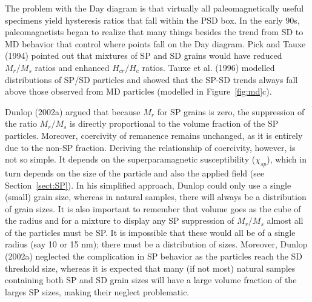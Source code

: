 The problem with the Day diagram is that virtually all paleomagnetically useful specimens yield hysteresis ratios that fall within the PSD box.  In the early 90s, paleomagnetists began to realize that many  things besides the trend from SD to MD behavior that  control where points fall on the Day diagram.   
Pick and Tauxe (1994) \nocite{pick94} pointed out that mixtures of SP and SD grains would have reduced $M_r/M_s$ ratios and enhanced $H_{cr}/H_c$ ratios. 
 Tauxe et al. (1996) \nocite{tauxe96} modelled distributions of SP/SD particles and showed that the SP-SD trends always fall above those observed from MD particles (modelled in Figure~\ref{fig:md}c).  

Dunlop (2002a)  \nocite{dunlop02a} argued  that because $M_r$ for SP grains is zero, the  suppression of the ratio $M_r/M_s$ is directly proportional to the volume fraction of the SP particles.  Moreover, 
coercivity of remanence remains unchanged, as it is entirely due to the non-SP fraction.    Deriving the relationship of coercivity, however, is not so simple.   It depends on the superparamagnetic susceptibility ($\chi_{sp}$), which in turn depends on the size of the particle and also the applied field  (see Section~\ref{sect:SP}).    In his simplified approach, Dunlop could only use a single (small) grain size, whereas in natural samples,  there will always be a distribution of grain sizes.     It is also important to remember that  volume goes as the cube of the radius and for a mixture to display any SP suppression of $M_r/M_s$ almost all of the particles must be SP.  It is impossible that these would all be of a single radius (say 10 or 15 nm); there must be a distribution of sizes.  Moreover, Dunlop (2002a) neglected the complication in SP behavior as the particles reach the SD threshold size, whereas it is expected that many (if not most) natural samples containing  both SP and SD grain sizes will have a large volume fraction of the larges SP sizes, making their neglect problematic. 

